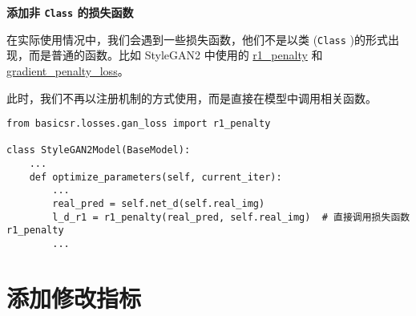 \documentclass[../main.tex]{subfiles}
\begin{document}
\begin{hl} %
    \textbf{添加非 \texttt{Class} 的损失函数}

    在实际使用情况中，我们会遇到一些损失函数，他们不是以类 (\texttt{Class} )的形式出现，而是普通的函数。比如 StyleGAN2 中使用的 \href{https://github.com/XPixelGroup/BasicSR/blob/master/basicsr/losses/gan_loss.py}{r1\_penalty} 和 \href{https://github.com/XPixelGroup/BasicSR/blob/master/basicsr/losses/gan_loss.py}{gradient\_penalty\_loss}。

    此时，我们不再以注册机制的方式使用，而是直接在模型中调用相关函数。
    \begin{verbatim}
from basicsr.losses.gan_loss import r1_penalty

class StyleGAN2Model(BaseModel):
    ...
    def optimize_parameters(self, current_iter):
        ...
        real_pred = self.net_d(self.real_img)
        l_d_r1 = r1_penalty(real_pred, self.real_img)  # 直接调用损失函数 r1_penalty
        ...
\end{verbatim}
\end{hl}

\section{添加修改指标}\label{howto:add_metric}
\end{document}
